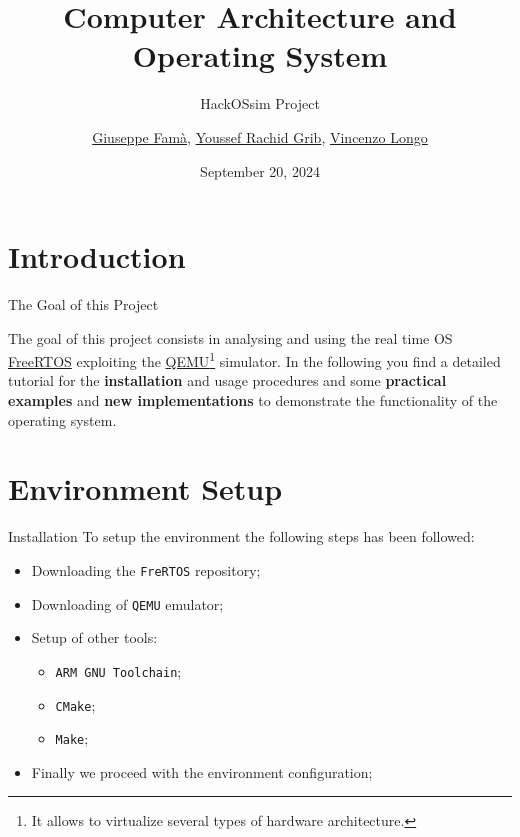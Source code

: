 \documentclass{beamer}
\title{Computer Architecture and Operating System}
\subtitle{HackOSsim Project}
\author{
    \href{mailto:user3@studenti.polito.it}{Giuseppe Famà}\IDnumber{54321},
    \href{mailto:user2@studenti.polito.it}{Youssef Rachid Grib}\IDnumber{67890},
    \href{mailto:vincenzo.longo@studenti.polito.it}{Vincenzo Longo}\IDnumber{328843}
}
\date{September 20, 2024}
\newcommand{\hrefcol}[2]{\textcolor{cyan}{\href{#1}{#2}}}
\begin{document}
\maketitle

\section{Introduction}

\begin{frame}{The Goal of this Project}

The goal of this project consists in analysing and using the real time OS \hrefcol{https://www.freertos.org/}{FreeRTOS} exploiting the \hrefcol{https://www.qemu.org/}{QEMU}\footnote{It allows to virtualize several types of hardware architecture.} simulator. In the following you find a detailed tutorial for the \textbf{installation} and usage procedures and some \textbf{practical examples} and \textbf{new implementations} to demonstrate the functionality of the operating system.

\end{frame}

\section{Environment Setup}
\begin{frame}{Installation}
    To setup the environment the following steps has been followed:
    \begin{itemize}
        \item Downloading the \texttt{FreRTOS} repository;
        \item Downloading of \texttt{QEMU} emulator;
        \item Setup of other tools:
        \begin{itemize}
            \item \texttt{ARM GNU Toolchain};
            \item \texttt{CMake};
            \item \texttt{Make};
        \end{itemize}
        \item Finally we proceed with the environment configuration;
    \end{itemize}
\end{frame}
\end{document}
